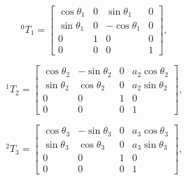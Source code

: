 
\begin{equation}
{}^{0}T_1 =
\begin{bmatrix}
\cos\theta_1 & 0 & \sin\theta_1 & 0 \\
\sin\theta_1 & 0 & -\cos\theta_1 & 0 \\
0            & 1 & 0             & 0 \\
0            & 0 & 0             & 1
\end{bmatrix},
\label{eq_T01}
\end{equation}

\begin{equation}
{}^{1}T_2 =
\begin{bmatrix}
\cos\theta_2 & -\sin\theta_2 & 0 & a_2\cos\theta_2 \\
\sin\theta_2 & \cos\theta_2  & 0 & a_2\sin\theta_2 \\
0            & 0             & 1 & 0 \\
0            & 0             & 0 & 1
\end{bmatrix},
\label{eq_T12}
\end{equation}

\begin{equation}
{}^{2}T_3 =
\begin{bmatrix}
\cos\theta_3 & -\sin\theta_3 & 0 & a_3\cos\theta_3 \\
\sin\theta_3 & \cos\theta_3  & 0 & a_3\sin\theta_3 \\
0            & 0             & 1 & 0 \\
0            & 0             & 0 & 1
\end{bmatrix},
\label{eq_T23}
\end{equation}


